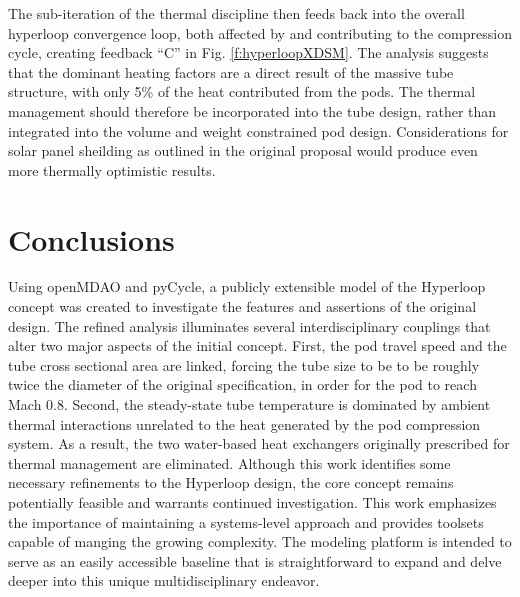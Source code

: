\documentclass[heading.tex]{subfiles}
\begin{document}
The sub-iteration of the thermal discipline then feeds back into the overall
hyperloop convergence loop, both affected by and contributing to the
compression cycle, creating feedback “C” in Fig. \ref{f:hyperloopXDSM}.
The analysis suggests that the dominant heating factors are a direct result of
the massive tube structure, with only 5\% of the heat contributed from the pods.
The thermal management should therefore be incorporated into the tube design,
rather than integrated into the volume and weight constrained pod design.
Considerations for solar panel sheilding as outlined in the original proposal
would produce even more thermally optimistic results.


\section{Conclusions}

Using openMDAO and pyCycle, a publicly extensible model of the Hyperloop concept was created 
to investigate the features and assertions of the original design. 
The refined analysis illuminates several
interdisciplinary couplings that alter two major aspects of the initial concept.
First, the pod travel speed and the tube cross sectional area are linked, forcing 
the tube size to be to be roughly twice the diameter of the original specification,
in order for the pod to reach Mach 0.8.
Second, the steady-state tube temperature is dominated by ambient thermal interactions
unrelated to the heat generated by the pod compression system. As a result,
the two water-based heat exchangers originally prescribed for thermal management are eliminated.
Although this work identifies some necessary refinements to the Hyperloop design, the core 
concept remains potentially feasible and warrants continued investigation. 
This work emphasizes the importance of maintaining a systems-level approach
and provides toolsets capable of manging the growing complexity.
The modeling platform is intended to serve as an easily accessible baseline that is straightforward to
expand and delve deeper into this unique multidisciplinary endeavor.
\end{document}
